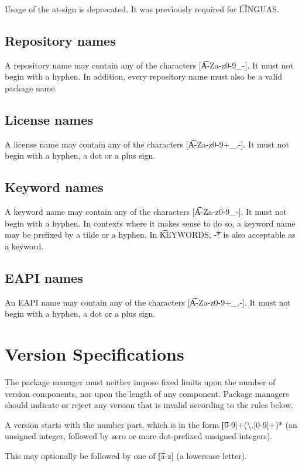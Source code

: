 \note Usage of the at-sign is deprecated. It was previously required for \t{LINGUAS}.

\subsection{Repository names}
\label{sec:repository-names}
A repository name may contain any of the characters [\t{A-Za-z0-9_-}]. It must not begin with a
hyphen. In addition, every repository name must also be a valid package name.

\subsection{License names}
\label{sec:license-names}
A license name may contain any of the characters [\t{A-Za-z0-9+_.-}]. It must not begin with a
hyphen, a dot or a plus sign.

\subsection{Keyword names}
\label{sec:keyword-names}
A keyword name may contain any of the characters [\t{A-Za-z0-9_-}]. It must not begin with a
hyphen. In contexts where it makes sense to do so, a keyword name may be prefixed by
a tilde or a hyphen. In \t{KEYWORDS}, \t{-*} is also acceptable as a keyword.

\subsection{EAPI names}
\label{sec:eapi-names}
An EAPI name may contain any of the characters [\t{A-Za-z0-9+_.-}]. It must not begin with a
hyphen, a dot or a plus sign.

\section{Version Specifications}
\label{sec:version-spec}
The package manager must neither impose fixed limits upon the number of version components, nor
upon the length of any component. Package managers should indicate or reject any version that is
invalid according to the rules below.

A version starts with the number part, which is in the form \t{[0-9]+(\textbackslash.[0-9]+)*}
(an unsigned integer, followed by zero or more dot-prefixed unsigned integers).

This may optionally be followed by one of \t{[a-z]} (a lowercase letter).


